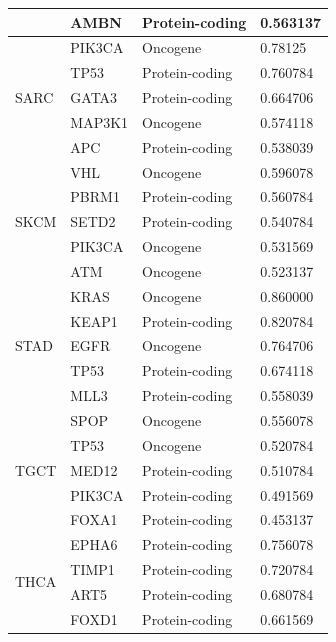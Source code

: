 \begin{table}
\begin{center}
{\begin{tabular}{l|l|l|l}
        & AMBN & Protein-coding & 0.563137 \\ %
        \midrule
        \multirow{5}{*}{SARC} & PIK3CA & Oncogene & 0.78125 \\ %
        & TP53 & Protein-coding & 0.760784 \\ %
        & GATA3  & Protein-coding & 0.664706 \\ %
        & MAP3K1  & Oncogene & 0.574118 \\ %
        & APC   & Protein-coding & 0.538039 \\ 
        \midrule
        \multirow{5}{*}{SKCM} & VHL & Oncogene & 0.596078 \\ %
        & PBRM1 & Protein-coding  & 0.560784 \\ %
        & SETD2 & Protein-coding & 0.540784 \\ %
        & PIK3CA & Oncogene & 0.531569 \\ %
        & ATM & Oncogene & 0.523137 \\ %
        \midrule
        \multirow{5}{*}{STAD}& KRAS & Oncogene & 0.860000 \\ %
        & KEAP1 & Protein-coding & 0.820784 \\ %
        & EGFR & Oncogene & 0.764706 \\ %
        & TP53 & Protein-coding & 0.674118 \\ %
        & MLL3 & Protein-coding & 0.558039 \\ %
        \midrule
        \multirow{5}{*}{TGCT}& SPOP & Oncogene & 0.556078 \\ %
        & TP53 & Oncogene & 0.520784 \\ %
        & MED12 & Protein-coding & 0.510784 \\ %
        & PIK3CA & Protein-coding & 0.491569 \\ %
        & FOXA1 & Protein-coding & 0.453137 \\ %
        \midrule
        \multirow{5}{*}{THCA}& EPHA6 & Protein-coding & 0.756078 \\ %
        & TIMP1 & Protein-coding & 0.720784 \\ %
        & ART5 & Protein-coding & 0.680784 \\ %
        & FOXD1 & Protein-coding & 0.661569 \\ %

\end{tabular}}
\end{center}
\end{table}
